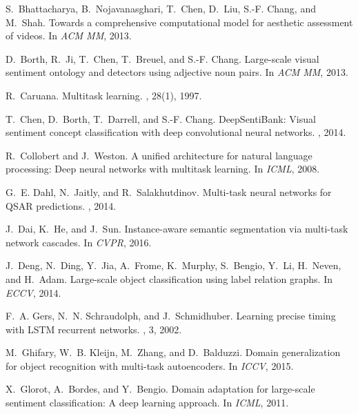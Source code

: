 \documentclass{sig-alternate-05-2015}
\begin{document}

\begin{thebibliography}{10}

S.~Bhattacharya, B.~Nojavanasghari, T.~Chen, D.~Liu, S.-F. Chang, and M.~Shah.
\newblock Towards a comprehensive computational model for aesthetic assessment
  of videos.
\newblock In {\em ACM MM}, 2013.

D.~Borth, R.~Ji, T.~Chen, T.~Breuel, and S.-F. Chang.
\newblock Large-scale visual sentiment ontology and detectors using adjective
  noun pairs.
\newblock In {\em ACM MM}, 2013.

R.~Caruana.
\newblock Multitask learning.
, 28(1), 1997.

T.~Chen, D.~Borth, T.~Darrell, and S.-F. Chang.
\newblock Deep{S}enti{B}ank: {V}isual sentiment concept classification with
  deep convolutional neural networks.
, 2014.

R.~Collobert and J.~Weston.
\newblock A unified architecture for natural language processing: {D}eep neural
  networks with multitask learning.
\newblock In {\em ICML}, 2008.

G.~E. Dahl, N.~Jaitly, and R.~Salakhutdinov.
\newblock Multi-task neural networks for {QSAR} predictions.
, 2014.

J.~Dai, K.~He, and J.~Sun.
\newblock Instance-aware semantic segmentation via multi-task network cascades.
\newblock In {\em CVPR}, 2016.

J.~Deng, N.~Ding, Y.~Jia, A.~Frome, K.~Murphy, S.~Bengio, Y.~Li, H.~Neven, and
  H.~Adam.
\newblock Large-scale object classification using label relation graphs.
\newblock In {\em ECCV}, 2014.

F.~A. Gers, N.~N. Schraudolph, and J.~Schmidhuber.
\newblock Learning precise timing with {LSTM} recurrent networks.
, 3, 2002.

M.~Ghifary, W.~B. Kleijn, M.~Zhang, and D.~Balduzzi.
\newblock Domain generalization for object recognition with multi-task
  autoencoders.
\newblock In {\em ICCV}, 2015.

X.~Glorot, A.~Bordes, and Y.~Bengio.
\newblock Domain adaptation for large-scale sentiment classification: {A} deep
  learning approach.
\newblock In {\em ICML}, 2011.


\end{thebibliography}
\end{document}
